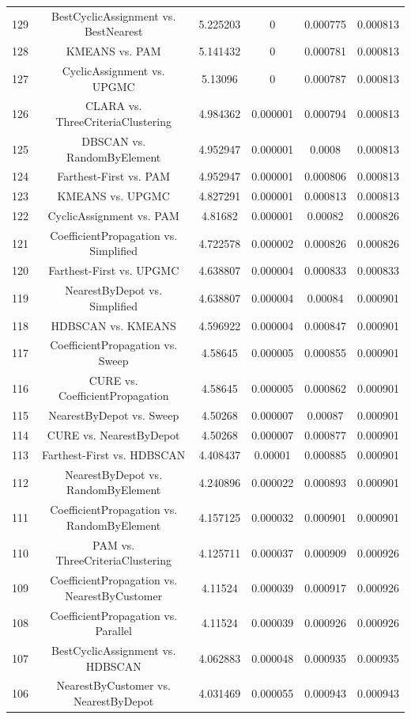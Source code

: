 \documentclass[a4paper,10pt]{article}
\begin{document}
\begin{landscape}
\begin{table}[!htp]
\begin{tabular}{cccccc}
129&BestCyclicAssignment vs. BestNearest&5.225203&0&0.000775&0.000813\\
128&KMEANS vs. PAM&5.141432&0&0.000781&0.000813\\
127&CyclicAssignment vs. UPGMC&5.13096&0&0.000787&0.000813\\
126&CLARA vs. ThreeCriteriaClustering&4.984362&0.000001&0.000794&0.000813\\
125&DBSCAN vs. RandomByElement&4.952947&0.000001&0.0008&0.000813\\
124&Farthest-First vs. PAM&4.952947&0.000001&0.000806&0.000813\\
123&KMEANS vs. UPGMC&4.827291&0.000001&0.000813&0.000813\\
122&CyclicAssignment vs. PAM&4.81682&0.000001&0.00082&0.000826\\
121&CoefficientPropagation vs. Simplified&4.722578&0.000002&0.000826&0.000826\\
120&Farthest-First vs. UPGMC&4.638807&0.000004&0.000833&0.000833\\
119&NearestByDepot vs. Simplified&4.638807&0.000004&0.00084&0.000901\\
118&HDBSCAN vs. KMEANS&4.596922&0.000004&0.000847&0.000901\\
117&CoefficientPropagation vs. Sweep&4.58645&0.000005&0.000855&0.000901\\
116&CURE vs. CoefficientPropagation&4.58645&0.000005&0.000862&0.000901\\
115&NearestByDepot vs. Sweep&4.50268&0.000007&0.00087&0.000901\\
114&CURE vs. NearestByDepot&4.50268&0.000007&0.000877&0.000901\\
113&Farthest-First vs. HDBSCAN&4.408437&0.00001&0.000885&0.000901\\
112&NearestByDepot vs. RandomByElement&4.240896&0.000022&0.000893&0.000901\\
111&CoefficientPropagation vs. RandomByElement&4.157125&0.000032&0.000901&0.000901\\
110&PAM vs. ThreeCriteriaClustering&4.125711&0.000037&0.000909&0.000926\\
109&CoefficientPropagation vs. NearestByCustomer&4.11524&0.000039&0.000917&0.000926\\
108&CoefficientPropagation vs. Parallel&4.11524&0.000039&0.000926&0.000926\\
107&BestCyclicAssignment vs. HDBSCAN&4.062883&0.000048&0.000935&0.000935\\
106&NearestByCustomer vs. NearestByDepot&4.031469&0.000055&0.000943&0.000943\\

\end{tabular}
\end{table}
\end{landscape}
\end{document}
